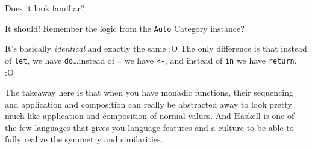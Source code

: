 \documentclass[]{article}
\newenvironment{Shaded}{}{}
\newcommand{\KeywordTok}[1]{\textcolor[rgb]{0.00,0.44,0.13}{\textbf{{#1}}}}
\newcommand{\DataTypeTok}[1]{\textcolor[rgb]{0.56,0.13,0.00}{{#1}}}
\newcommand{\CommentTok}[1]{\textcolor[rgb]{0.38,0.63,0.69}{\textit{{#1}}}}
\newcommand{\OtherTok}[1]{\textcolor[rgb]{0.00,0.44,0.13}{{#1}}}
\newcommand{\FunctionTok}[1]{\textcolor[rgb]{0.02,0.16,0.49}{{#1}}}
\newcommand{\NormalTok}[1]{{#1}}
\begin{document}
\begin{Shaded}
\end{Shaded}

Does it look familiar?

It should! Remember the logic from the \texttt{Auto} Category instance?

\begin{Shaded}
\end{Shaded}

It's basically \emph{identical} and exactly the same :O The only
difference is that instead of \texttt{let}, we have
\texttt{do}\ldots{}instead of \texttt{=} we have \texttt{\textless{}-},
and instead of \texttt{in} we have \texttt{return}. :O

The takeaway here is that when you have monadic functions, their
sequencing and application and composition can really be abstracted away
to look pretty much like application and composition of normal values.
And Haskell is one of the few languages that gives you language features
and a culture to be able to fully realize the symmetry and similarities.
\end{document}
